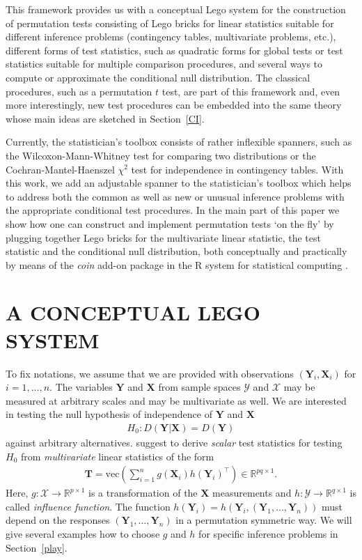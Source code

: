 \documentclass{article}
\newcommand{\Rpackage}[1]{\textit{#1}}
\newcommand{\RR}{\textsf{R}}
\newcommand{\R}{\mathbb{R} }
\newcommand{\X}{\mathbf{X}}
\newcommand{\Y}{\mathbf{Y}}
\newcommand{\T}{\mathbf{T}}
\renewcommand{\vec}{\text{vec}}
\begin{document}
This framework provides us with a conceptual Lego system for the construction
of permutation tests consisting of Lego bricks for linear statistics
suitable for different inference problems (contingency tables, multivariate
problems, etc.), different forms of test statistics, such as quadratic forms
for global tests or test statistics suitable for multiple comparison
procedures, and several ways to compute or approximate the conditional null
distribution. The classical procedures, such as a permutation $t$ test, are part
of this framework and, even more interestingly, new test procedures can be
embedded into the same theory whose main ideas are sketched in
Section~\ref{CI}.

Currently, the statistician's toolbox consists of rather inflexible spanners,
such as the Wilcoxon-Mann-Whitney test for comparing two distributions 
or the Cochran-Mantel-Haenszel $\chi^2$ test for independence in
contingency tables. With this work, we add an adjustable spanner to the 
statistician's toolbox which helps to address both the common as well 
as new or unusual inference problems with the appropriate 
conditional test procedures. In the main part of this paper we show how one can
construct and implement permutation tests `on the fly' by plugging together Lego bricks for
the multivariate linear statistic, the test statistic and the conditional
null distribution, both conceptually and practically by means of the 
\Rpackage{coin} add-on package 
 \citep{PKG:coin} in the \RR{} system for statistical computing
\citep{Rcore2005}.


\section{A CONCEPTUAL LEGO SYSTEM \label{CI}}

To fix notations,
we assume that we are provided with observations
$(\Y_i, \X_i)$ for $i = 1, \dots, n$.
The variables $\Y$ and $\X$ from sample spaces $\mathcal{Y}$ and
$\mathcal{X}$ may
be measured at arbitrary scales and may be multivariate as well. 
We are interested in testing the null hypothesis of independence of $\Y$ and $\X$
\begin{eqnarray*}
H_0: D(\Y | \X) = D(\Y)
\end{eqnarray*}
against arbitrary alternatives. \cite{StrasserWeber1999} suggest to derive
\textit{scalar} test statistics for testing $H_0$ from \textit{multivariate}
linear statistics of the form 
\begin{eqnarray*}
\T = \vec\left(\sum_{i = 1}^n g(\X_i) h(\Y_i)^\top\right)
\in \R^{pq \times 1}.
\end{eqnarray*}
Here, $g: \mathcal{X} \rightarrow \R^{p \times 1}$ is a transformation of
the $\X$ measurements and $h: \mathcal{Y} \rightarrow
\R^{q \times 1}$ is called \emph{influence function}. The function $h(\Y_i)
= h(\Y_i, (\Y_1, \dots, \Y_n))$ must depend on the responses $(\Y_1, \dots, \Y_n)$ in a permutation
symmetric way. We will give several examples how to choose $g$ and $h$
for specific inference problems in Section~\ref{play}.
\end{document}
